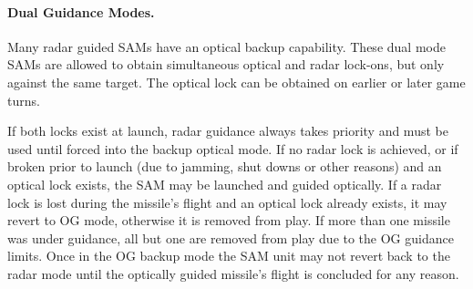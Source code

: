 
\paragraph{Dual Guidance Modes.} Many radar guided SAMs have an optical backup capability. These dual mode SAMs are allowed to obtain simultaneous optical and radar lock-ons, but only against the same target. The optical lock can be obtained on earlier or later game turns.

If both locks exist at launch, radar guidance always takes priority and must be used until forced into the backup optical mode. If no radar lock is achieved, or if broken prior to launch (due to jamming, shut downs or other reasons) and an optical lock exists, the SAM may be launched and guided optically. If a radar lock is lost during the missile's flight and an optical lock already exists, it may revert to OG mode, otherwise it is removed from play. If more than one missile was under guidance, all but one are removed from play due to the OG guidance limits. Once in the OG backup mode the SAM unit may not revert back to the radar mode until the optically guided missile's flight is concluded for any reason.